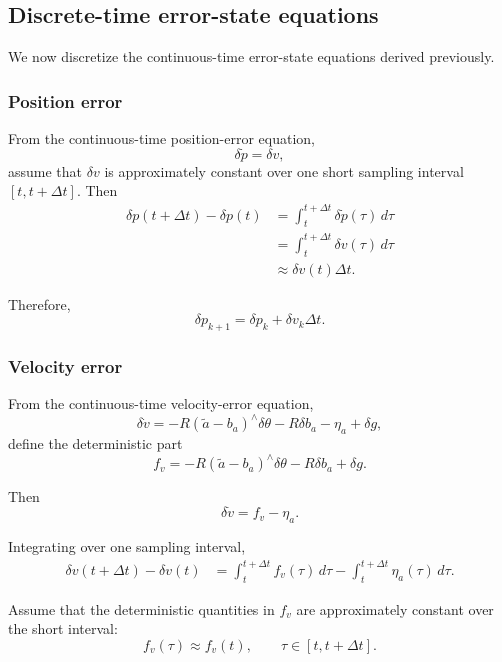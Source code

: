 \documentclass[11pt]{article}
\numberwithin{equation}{section}
\begin{document}
\subsection{Discrete-time error-state equations}

We now discretize the continuous-time error-state equations derived
previously.

\subsubsection*{Position error}

From the continuous-time position-error equation,
\[
\delta\dot p=\delta v,
\]
assume that $\delta v$ is approximately constant over one short
sampling interval $[t,t+\Delta t]$. Then
\begin{align}
\delta p(t+\Delta t)-\delta p(t)
&=
\int_t^{t+\Delta t}\delta\dot p(\tau)\,d\tau\\
&=
\int_t^{t+\Delta t}\delta v(\tau)\,d\tau\\
&\approx
\delta v(t)\Delta t.
\end{align}

Therefore,
\begin{equation}
\boxed{
\delta p_{k+1}
=
\delta p_k+\delta v_k\Delta t.
}
\end{equation}

\subsubsection*{Velocity error}

From the continuous-time velocity-error equation,
\[
\delta\dot v
=
-R(\tilde a-b_a)^\wedge\delta\theta
-R\delta b_a
-\eta_a
+\delta g,
\]
define the deterministic part
\begin{equation}
\boxed{
f_v
=
-R(\tilde a-b_a)^\wedge\delta\theta
-R\delta b_a
+\delta g.
}
\end{equation}

Then
\[
\delta\dot v=f_v-\eta_a.
\]

Integrating over one sampling interval,
\begin{align}
\delta v(t+\Delta t)-\delta v(t)
&=
\int_t^{t+\Delta t}f_v(\tau)\,d\tau
-
\int_t^{t+\Delta t}\eta_a(\tau)\,d\tau.
\end{align}

Assume that the deterministic quantities in $f_v$ are approximately
constant over the short interval:
\begin{equation}
\boxed{
f_v(\tau)\approx f_v(t),
\qquad
\tau\in[t,t+\Delta t].
}
\end{equation}
\end{document}
